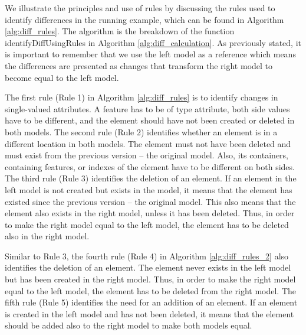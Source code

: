 We illustrate the principles and use of rules by discussing the rules used to identify differences in the running example, which can be found in Algorithm \ref{alg:diff_rules}. The algorithm is the breakdown of the function \textsf{identifyDiffUsingRules} in Algorithm \ref{alg:diff_calculation}. As previously stated, it is important to remember that we use the left model as a reference which means the differences are presented as changes that transform the right model to become equal to the left model. 

The first rule (Rule 1) in Algorithm \ref{alg:diff_rules} is to identify changes in single-valued attributes. A feature has to be of type \textsf{attribute}, both side values have to be different, and the element should have not been created or deleted in both models. The second rule (Rule 2) identifies whether an element is in a different location in both models. The element must not have been deleted and must exist from the previous version -- the original model. Also, its containers, containing features, or indexes of the element have to be different on both sides. The third rule (Rule 3) identifies the deletion of an element. If an element in the left model is not created but exists in the model, it means that the element has existed since  the previous version -- the original model. This also means that the element also exists in the right model, unless it has been deleted. Thus, in order to make the right model equal to the left model, the element has to be deleted also in the right model. 

Similar to Rule 3, the fourth rule (Rule 4) in Algorithm \ref{alg:diff_rules_2} also identifies the deletion of an element. The element never exists in the left model but has been created in the right model. Thus, in order to make the right model equal to the left model, the element has to be deleted from the right model. The fifth rule (Rule 5) identifies the need for an addition of an element. If an element is created in the left model and has not been deleted, it means that the element should be added also to the right model to make both models equal.

